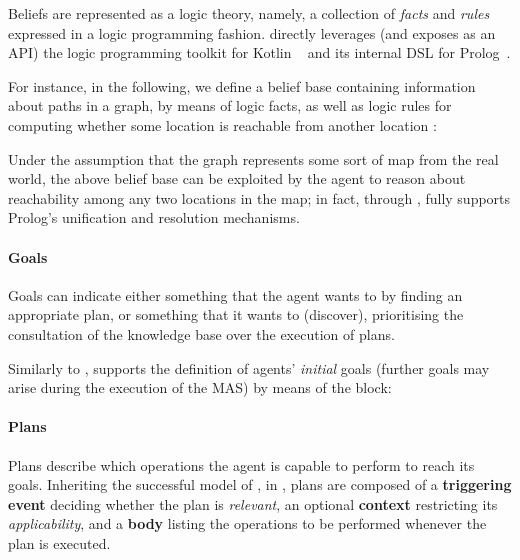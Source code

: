 Beliefs are represented as a logic theory,
namely, a collection of \emph{facts} and \emph{rules} expressed in a logic programming fashion.
%
\jakta{} directly leverages (and exposes as an \ac{API})
the logic programming toolkit for Kotlin \twopkt{}~\cite{2pkt-swx16} and its internal \ac{DSL} for Prolog~\cite{kotlindsi4prolog-woa2020}.

For instance,
in the following, we define a belief base containing information about paths in a graph,
by means of logic facts, as well as logic rules for computing whether some location
 is reachable from another location :
%


Under the assumption that the graph represents some sort of map from the real world,
the above belief base can be exploited by the agent to reason about reachability among
any two locations in the map;
in fact, through \twopkt{},
\jakta{} fully supports Prolog's unification and resolution mechanisms.

\paragraph{Goals}

Goals can indicate either something that the agent wants to
by finding an appropriate plan,
or something that it wants to  (discover),
prioritising the consultation of the knowledge base over the execution of plans.

Similarly to \jason{},
\jakta{} supports the definition of agents' \emph{initial} goals
(further goals may arise during the execution of the \ac{MAS})
by means of the  block:
%

%

\paragraph{Plans}

Plans describe which operations the agent is capable to perform to reach its goals.
%
Inheriting the successful model of \jason{},
in \jakta{}, plans are composed of
a \textbf{triggering event} deciding whether the plan is \emph{relevant},
an optional \textbf{context} restricting its \emph{applicability},
and a \textbf{body} listing the operations to be performed whenever the plan is executed.

